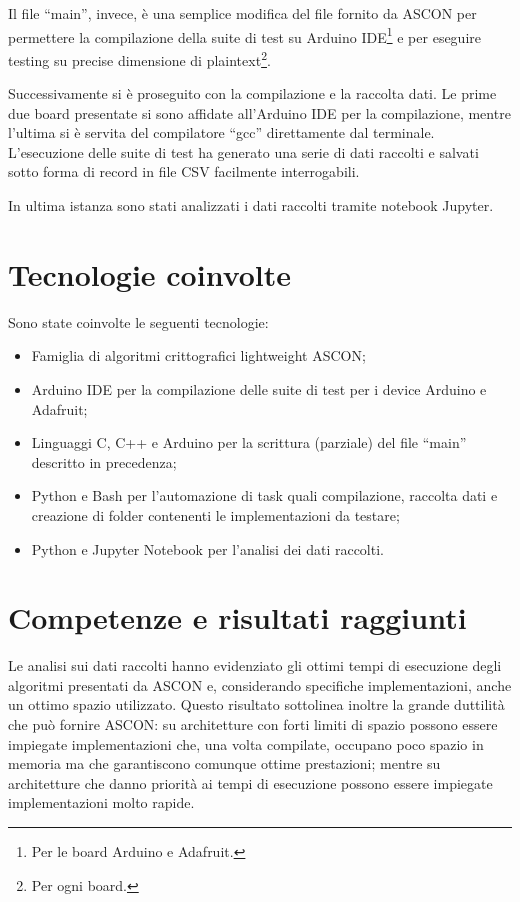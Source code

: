 \documentclass[a4paper, 12pt, italian]{extarticle}
\begin{document}
Il file ``main'', invece, è una semplice modifica del file fornito da ASCON per permettere la compilazione della suite di test su Arduino IDE\footnote{Per le board Arduino e Adafruit.} e per eseguire testing su precise dimensione di plaintext\footnote{Per ogni board.}.

Successivamente si è proseguito con la compilazione e la raccolta dati. Le prime due board presentate si sono affidate all'Arduino IDE per la compilazione, mentre l'ultima si è servita del compilatore ``gcc'' direttamente dal terminale. L'esecuzione delle suite di test ha generato una serie di dati raccolti e salvati sotto forma di record in file CSV facilmente interrogabili.

In ultima istanza sono stati analizzati i dati raccolti tramite notebook Jupyter.

\section{Tecnologie coinvolte}

Sono state coinvolte le seguenti tecnologie:
\begin{itemize}
    \item Famiglia di algoritmi crittografici lightweight ASCON;
    \item Arduino IDE per la compilazione delle suite di test per i device Arduino e Adafruit;
    \item Linguaggi C, C++ e Arduino per la scrittura (parziale) del file ``main'' descritto in precedenza;
    \item Python e Bash per l'automazione di task quali compilazione, raccolta dati e creazione di folder contenenti le implementazioni da testare;
    \item Python e Jupyter Notebook per l'analisi dei dati raccolti.
\end{itemize}

\section{Competenze e risultati raggiunti}

Le analisi sui dati raccolti hanno evidenziato gli ottimi tempi di esecuzione degli algoritmi presentati da ASCON e, considerando specifiche implementazioni, anche un ottimo spazio utilizzato. Questo risultato sottolinea inoltre la grande duttilità che può fornire ASCON: su architetture con forti limiti di spazio possono essere impiegate implementazioni che, una volta compilate, occupano poco spazio in memoria ma che garantiscono comunque ottime prestazioni; mentre su architetture che danno priorità ai tempi di esecuzione possono essere impiegate implementazioni molto rapide.
\end{document}
